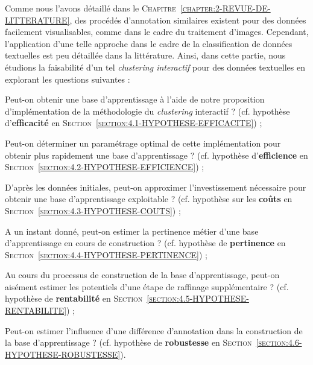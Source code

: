	Comme nous l'avons détaillé dans le \textsc{Chapitre~\ref{chapter:2-REVUE-DE-LITTERATURE}}, des procédés d'annotation similaires existent pour des données facilement visualisables, comme dans le cadre du traitement d'images.
	Cependant, l'application d'une telle approche dans le cadre de la classification de données textuelles est peu détaillée dans la littérature.
	Ainsi, dans cette partie, nous étudions la faisabilité d'un tel \textit{clustering interactif} pour des données textuelles en explorant les questions suivantes :
	\begin{leftBarImportantRed}
		\begin{todolist}
			\item Peut-on obtenir une base d'apprentissage à l'aide de notre proposition d'implémentation de la méthodologie du \textit{clustering} interactif ? (cf. hypothèse d'\textbf{efficacité} en \textsc{Section~\ref{section:4.1-HYPOTHESE-EFFICACITE}}) ;
			\item Peut-on déterminer un paramétrage optimal de cette implémentation pour obtenir plus rapidement une base d'apprentissage ? (cf. hypothèse d'\textbf{efficience} en \textsc{Section~\ref{section:4.2-HYPOTHESE-EFFICIENCE}}) ;
			\item D'après les données initiales, peut-on approximer l'investissement nécessaire pour obtenir une base d'apprentissage exploitable ? (cf. hypothèse sur les \textbf{coûts} en \textsc{Section~\ref{section:4.3-HYPOTHESE-COUTS}}) ;
			\item A un instant donné, peut-on estimer la pertinence métier d'une base d'apprentissage en cours de construction ? (cf. hypothèse de \textbf{pertinence} en \textsc{Section~\ref{section:4.4-HYPOTHESE-PERTINENCE}}) ;
			\item Au cours du processus de construction de la base d'apprentissage, peut-on aisément estimer les potentiels d'une étape de raffinage supplémentaire ? (cf. hypothèse de \textbf{rentabilité} en \textsc{Section~\ref{section:4.5-HYPOTHESE-RENTABILITE}}) ;
			\item Peut-on estimer l'influence d'une différence d'annotation dans la construction de la base d'apprentissage ? (cf. hypothèse de \textbf{robustesse} en \textsc{Section~\ref{section:4.6-HYPOTHESE-ROBUSTESSE}}).
		\end{todolist}
	\end{leftBarImportantRed}
	

